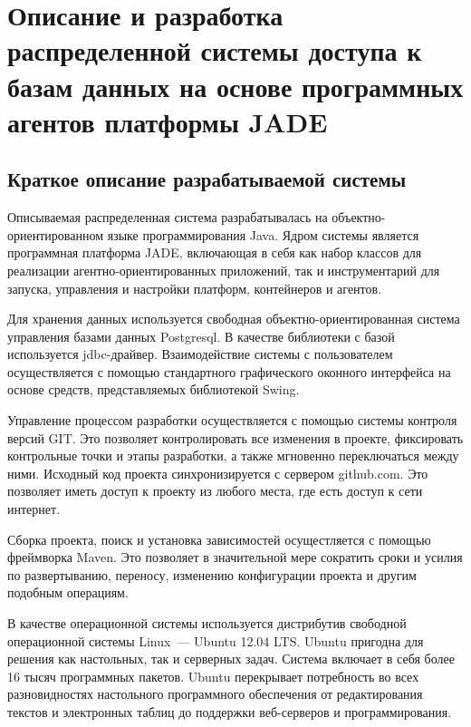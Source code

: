 \section{Описание и разработка распределенной системы доступа к базам данных на основе программных агентов платформы JADE}
\subsection{Краткое описание разрабатываемой системы}
Описываемая распределенная система разрабатывалась на объектно-ориентированном языке программирования Java. Ядром системы является программная платформа JADE, включающая в себя как набор классов для реализации агентно-ориентированных приложений, так и инструментарий для запуска, управления и настройки платформ, контейнеров и агентов.

	Для хранения данных используется свободная объектно-ориентированная система управления базами данных Postgresql. В качестве библиотеки с базой используется jdbc-драйвер. Взаимодействие системы с пользователем осуществляется с помощью стандартного графического оконного интерфейса на основе средств, представляемых библиотекой Swing.

	Управление процессом разработки осуществляется с помощью системы контроля версий GIT. Это позволяет контролировать все изменения в проекте, фиксировать контрольные точки и этапы разработки, а также мгновенно переключаться между ними. Исходный код проекта синхронизируется с сервером github.com. Это позволяет иметь доступ к проекту из любого места, где есть доступ к сети интернет.

	Сборка проекта, поиск и установка зависимостей осущестляется с помощью фреймворка Maven. Это позволяет в значительной мере сократить сроки и усилия по развертыванию, переносу, изменению конфигурации проекта и другим подобным операциям.

В качестве операционной системы используется дистрибутив свободной операционной системы Linux~--- Ubuntu 12.04 LTS. Ubuntu пригодна для решения как настольных, так и серверных задач. Система включает в себя более 16 тысяч программных пакетов. Ubuntu перекрывает потребность во всех разновидностях настольного программного обеспечения от редактирования текстов и электронных таблиц до поддержки веб-серверов и программирования. 

